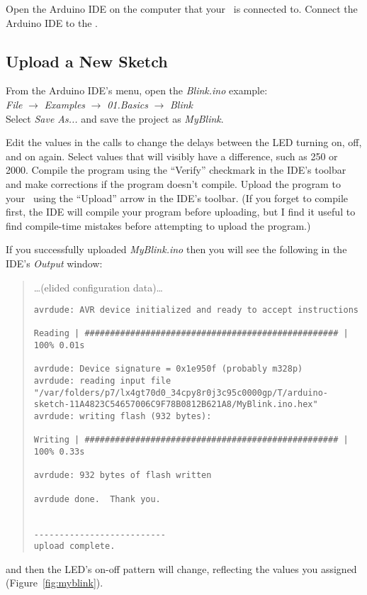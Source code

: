 Open the Arduino IDE on the computer that your \developmentboard\ is connected to.
Connect the Arduino IDE to the \developmentboard.


\subsection{Upload a New Sketch}

From the Arduino IDE's menu, open the \textit{Blink.ino} example: \\
\textit{File} $\rightarrow$ \textit{Examples} $\rightarrow$ \textit{01.Basics} $\rightarrow$ \textit{Blink} \\
Select \textit{Save As...} and save the project as \textit{MyBlink}.

Edit the values in the  calls to change the delays between the LED turning on, off, and on again.
Select values that will visibly have a difference, such as 250 or 2000.
Compile the program using the ``Verify'' checkmark in the IDE's toolbar and make corrections if the program doesn't compile.
Upload the program to your \developmentboard\ using the ``Upload'' arrow in the IDE's toolbar.
(If you forget to compile first, the IDE will compile your program before uploading, but I find it useful to find compile-time mistakes before attempting to upload the program.)

If you successfully uploaded \textit{MyBlink.ino} then you will see the following in the IDE's \textit{Output} window:
\begin{quote}
\dots (elided configuration data)\dots
\begin{verbatim}
avrdude: AVR device initialized and ready to accept instructions

Reading | ################################################## | 100% 0.01s

avrdude: Device signature = 0x1e950f (probably m328p)
avrdude: reading input file "/var/folders/p7/lx4gt70d0_34cpy8r0j3c95c0000gp/T/arduino-sketch-11A4823C54657006C9F78B0812B621A8/MyBlink.ino.hex"
avrdude: writing flash (932 bytes):

Writing | ################################################## | 100% 0.33s

avrdude: 932 bytes of flash written

avrdude done.  Thank you.


--------------------------
upload complete.
\end{verbatim}\end{quote}
and then the LED's on-off pattern will change, reflecting the  values you assigned (Figure~\ref{fig:myblink}).

